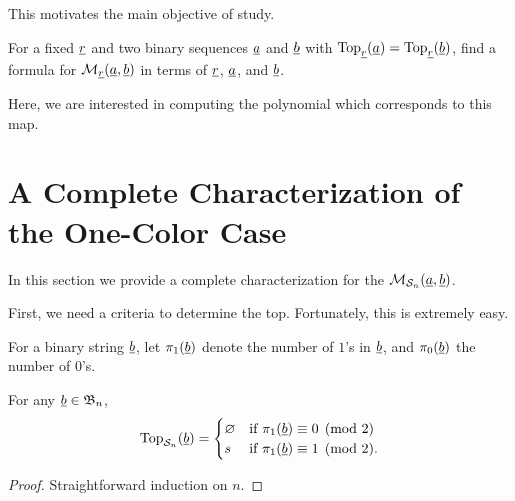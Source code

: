 This motivates the main objective of study.
\begin{ques*}
	For a fixed $\underline{r}$ and two binary sequences $\underline{a}$ and $\underline{b}$ with $\operatorname{Top}_{\underline{r}}(\underline{a}) = \operatorname{Top}_{\underline{r}}(\underline{b})$, find a formula for $\mathcal M_{\underline{r}}(\underline{a}, \underline{b})$ in terms of $\underline{r}$, $\underline{a}$, and $\underline{b}$.
\end{ques*}
Here, we are interested in computing the polynomial which corresponds to this map.

\section{A Complete Characterization of the One-Color Case}
\label{sec:res_onecolor}
In this section we provide a complete characterization for the $\mathcal M_{\mathcal S_n}(\underline{a}, \underline{b})$.  %

First, we need a criteria to determine the top.  Fortunately, this is extremely easy.
\begin{definition*}
	For a binary string $\underline{b}$, let $\pi_1(\underline{b})$ denote the number of $1$'s in $\underline{b}$, and $\pi_0(\underline{b})$ the number of $0$'s.
\end{definition*}
\begin{proposition}
	For any $\underline{b} \in \mathfrak B_n$, \[
		\operatorname{Top}_{\mathcal S_n}(\underline{b}) =
		\begin{cases}
			\varnothing & \text{if } \pi_1(\underline{b}) \equiv 0 \pmod{2} \\
			s & \text{if } \pi_1(\underline{b}) \equiv 1 \pmod{2}.
		\end{cases}
		\]
	\label{prop:s_top}
\end{proposition}
\begin{proof}
	Straightforward induction on $n$.  
\end{proof}

